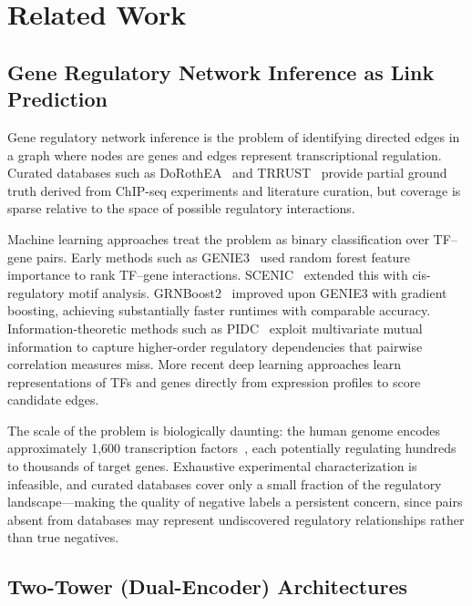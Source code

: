 \documentclass[journal]{IEEEtran}
\begin{document}
\section{Related Work}
\label{sec:related}

\subsection{Gene Regulatory Network Inference as Link Prediction}

Gene regulatory network inference is the problem of identifying directed edges
in a graph where nodes are genes and edges represent transcriptional
regulation. Curated databases such as DoRothEA~\cite{garcia2019} and
TRRUST~\cite{han2018} provide partial ground truth derived from ChIP-seq
experiments and literature curation, but coverage is sparse relative to the
space of possible regulatory interactions.

Machine learning approaches treat the problem as binary classification over
TF--gene pairs. Early methods such as GENIE3~\cite{huynh2010} used random
forest feature importance to rank TF--gene interactions. SCENIC~\cite{aibar2017}
extended this with cis-regulatory motif analysis. GRNBoost2~\cite{moerman2019}
improved upon GENIE3 with gradient boosting, achieving substantially faster
runtimes with comparable accuracy. Information-theoretic methods such as
PIDC~\cite{chan2017} exploit multivariate mutual information to capture
higher-order regulatory dependencies that pairwise correlation measures miss.
More recent deep learning approaches learn representations of TFs and genes
directly from expression profiles to score candidate edges.

The scale of the problem is biologically daunting: the human genome encodes
approximately 1,600 transcription factors~\cite{lambert2018}, each potentially
regulating hundreds to thousands of target genes. Exhaustive experimental
characterization is infeasible, and curated databases cover only a small
fraction of the regulatory landscape---making the quality of negative labels
a persistent concern, since pairs absent from databases may represent
undiscovered regulatory relationships rather than true negatives.

\subsection{Two-Tower (Dual-Encoder) Architectures}
\end{document}
